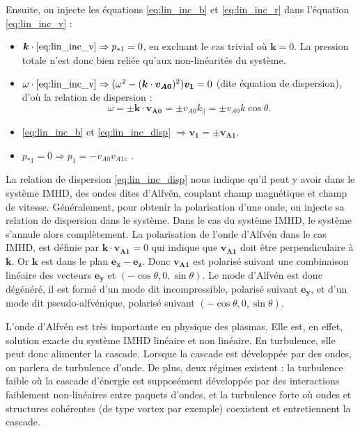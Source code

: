 Ensuite, on injecte les équations \eqref{eq:lin_inc_b} et \eqref{eq:lin_inc_r} dans l'équation \eqref{eq:lin_inc_v} : 
\begin{itemize}
    \item $\boldsymbol{k} \cdot \eqref{eq:lin_inc_v} \Rightarrow  p_{*1} =0$, en excluant le cas trivial où $\boldsymbol{k}=0$. La pression totale n'est donc bien reliée qu'aux non-linéarités du système.
    \item $\omega \cdot \eqref{eq:lin_inc_v} \Rightarrow (\omega^2   - (\boldsymbol{k} \cdot \boldsymbol{v_{A0}})^2 ) \boldsymbol{v_{1}} = 0$ (dite équation de dispersion), d'où la relation de dispersion :  
    \begin{equation}
        \label{eq:lin_inc_disp} \omega = \pm \boldsymbol{k} \cdot \boldsymbol{v_{A0}} = \pm v_{A0} k_{\parallel} =  \pm v_{A0} k \cos \theta .
    \end{equation}
    \item \eqref{eq:lin_inc_b} et \eqref{eq:lin_inc_disp} $ \Rightarrow \boldsymbol{v_{1}} = \pm \boldsymbol{v_{A1}}$.
    \item $ p_{*1} =0 \Rightarrow p_{1} = - v_{A0} v_{A1z}$ .
\end{itemize}
La relation de dispersion \eqref{eq:lin_inc_disp} nous indique qu'il peut y avoir dans le système \acs{IMHD}, des ondes dites d'Alfvén, couplant champ magnétique et champ de vitesse. 
Généralement, pour obtenir la polarisation d'une onde, on injecte sa relation de dispersion dans le système. Dans le cas du système \acs{IMHD}, le système s'annule alors complètement. La polarisation de l'onde d'Alfvén dans le cas \acs{IMHD}, est définie par $\boldsymbol{k} \cdot \boldsymbol{v_{A1}}  = 0 $ qui indique que $\boldsymbol{v_{A1}} $ doit être perpendiculaire à $\boldsymbol{k}$. Or $\boldsymbol{k}$ est dans le plan $\boldsymbol{e_x}-\boldsymbol{e_z}$. Donc $\boldsymbol{v_{A1}} $ est polarisé suivant une combinaison linéaire des vecteurs $\boldsymbol{e_y}$ et $(-\cos \theta, 0, \sin \theta)$. Le mode d'Alfvén est donc dégénéré, il est formé d'un mode dit incompressible, polarisé suivant $\boldsymbol{e_y}$, et d'un mode dit pseudo-alfvénique, polarisé suivant $(-\cos \theta, 0, \sin \theta)$.

L'onde d'Alfvén est très importante en physique des plasmas. Elle est, en effet, solution exacte du système \acs{IMHD} linéaire et non linéaire. En turbulence, elle peut donc alimenter la cascade. Lorsque la cascade est développée par des ondes, on parlera de turbulence d'onde. De plus, deux régimes existent :  la turbulence faible où la cascade d'énergie est supposément développée par des interactions faiblement non-linéaires entre paquets d'ondes, et la turbulence forte où ondes et structures cohérentes (de type vortex par exemple) coexistent et entretiennent la cascade. 


